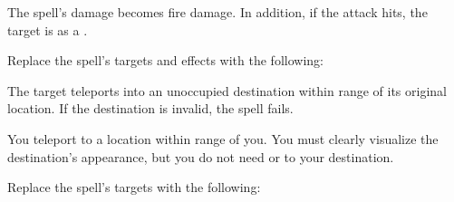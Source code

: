 
The spell's damage becomes fire damage.
In addition, if the attack hits, the target is  as a .









Replace the spell's targets and effects with the following:
\begin{spellcontent}

\begin{augmenttargetinginfo}




\end{augmenttargetinginfo}


\begin{augmenteffects}



\spelleffect
The target teleports into an unoccupied destination within \rngmed range of its original location.
If the destination is invalid, the spell fails.








\end{augmenteffects}

\end{spellcontent}






You teleport to a location within \rngext range of you.
You must clearly visualize the destination's appearance, but you do not need  or  to your destination.



Replace the spell's targets with the following:
\begin{spellcontent}

\begin{augmenttargetinginfo}




\end{augmenttargetinginfo}

\end{spellcontent}





